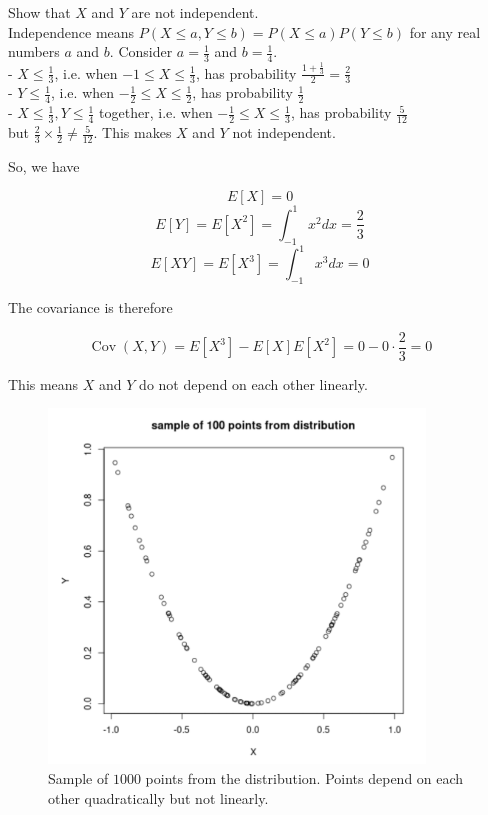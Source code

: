 \documentclass[12pt, a4paper]{article}
\newcounter{exa}
\newcommand{\Cov}{\operatorname{Cov}}
\begin{document}
\begin{texample}
Show that $X$ and $Y$ are not independent. \\

Independence means $P(X\le a, Y\le b)=P(X\le a) P(Y\le b)$ for any real numbers $a$ and $b$. Consider $a=\frac13$ and $b=\frac 14$. \\

- $X \le \frac 13$, i.e. when $-1 \le X \le \frac13$, has probability $\frac{1+\frac13}{2}=\frac23$ \\
- $Y \le \frac 14$, i.e. when $-\frac12 \le X \le \frac12$, has probability $\frac12$ \\
- $X \le \frac 13, Y \le \frac 14$ together, i.e. when $-\frac12 \le X \le \frac13$, has probability $\frac5{12}$ \\

but $\frac23 \times \frac12 \not=\frac5{12}$. This makes $X$ and $Y$ not independent.
\end{texample}

So, we have

$$E[X] = 0$$
$$E[Y] = E[X^2] = \int_{-1}^{1} x^2  dx = \frac23$$
$$E[XY] = E[X^3] = \int_{-1}^{1} x^3 dx = 0$$

The covariance is therefore

\[ \Cov(X,Y) = E[X^3] - E[X] E[X^2] = 0 - 0 \cdot \frac23 = 0 \]

This means $X$ and $Y$ do not depend on each other linearly.

\begin{figure}[H]
\centering
\includegraphics[width=100mm]{22.png}
\caption{Sample of $1000$ points from the distribution. Points depend on each other quadratically but not linearly.}
\end{figure}
\end{document}
